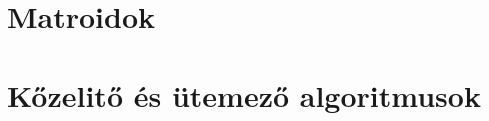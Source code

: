 \documentclass[a4paper,12pt,oneside,openright]{report}
\begin{document}


\tableofcontents
%
%
%
%
%
%
%
\chapter{Matroidok}
%
%
%
%
%


\chapter{Kőzelitő és ütemező algoritmusok}


\end{document}
